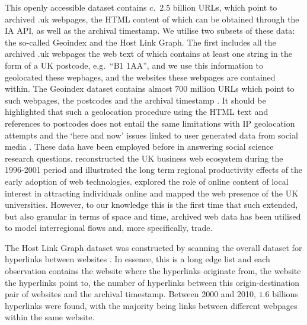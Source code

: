 \documentclass[]{interact}
\theoremstyle{plain}%
\theoremstyle{definition}
\theoremstyle{remark}
\begin{document}
This openly accessible dataset contains c.~\(2.5\) billion URLs, which
point to archived .uk webpages, the HTML content of which can be
obtained through the IA API, as well as the archival timestamp. We
utilise two subsets of these data: the so-called Geoindex and the Host
Link Graph. The first includes all the archived .uk webpages the web
text of which contains at least one string in the form of a UK postcode,
e.g.~``B1 1AA'', and we use this information to geolocated these
wepbages, and the websites these webpages are contained within. The
Geoindex dataset contains almost \(700\) million URLs which point to
such webpages, the postcodes and the archival timestamp
\citep{BL2013geo}. It should be highlighted that such a geolocation
procedure using the HTML text and references to postcodes does not
entail the same limitations with IP geolocation attempts
\citep{zook2000web} and the `here and now' issues linked to user
generated data from social media \citep{geotag}. These data have been
employed before in answering social science research questions.
\citet{Musso2016} reconstructed the UK business web ecosystem during the
1996-2001 period and \citet{tranos2020digital} illustrated the long term
regional productivity effects of the early adoption of web technologies.
\citet{tranos2020individual} explored the role of online content of
local interest in attracting individuals online and \citet{Hale2014}
mapped the web presence of the UK universities. However, to our
knowledge this is the first time that such extended, but also granular
in terms of space and time, archived web data has been utilised to model
interregional flows and, more specifically, trade.

The Host Link Graph dataset was constructed by scanning the overall
dataset for hyperlinks between websites \citep{BL2013links}. In essence,
this is a long edge list and each observation contains the website where
the hyperlinks originate from, the website the hyperlinks point to, the
number of hyperlinks between this origin-destination pair of websites
and the archival timestamp. Between 2000 and 2010, \(1.6\) billions
hyperlinks were found, with the majority being links between different
webpages within the same website.
\end{document}
